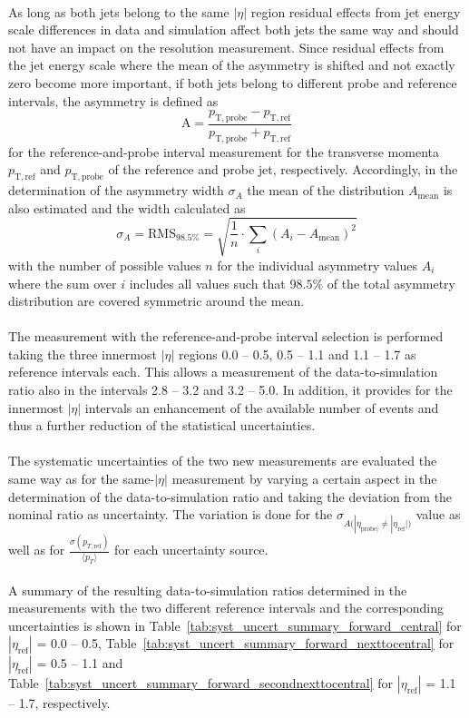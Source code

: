 \\
As long as both jets belong to the same $|\eta|$ region residual effects from jet energy scale differences in data and simulation affect both jets the same way and should not have an impact on the resolution measurement. Since residual effects from the jet energy scale where the mean of the asymmetry is shifted and not exactly zero become more important, if both jets belong to different probe and reference intervals, the asymmetry is defined as
\begin{equation}
\label{eq:forwardasymmdef}
  \mathrm{A} = \frac{p_{\mathrm{T,probe}} - p_{\mathrm{T,ref}}}{p_{\mathrm{T,probe}} + p_{\mathrm{T,ref}}} 
 \end{equation}
for the reference-and-probe interval measurement for the transverse momenta $p_{\mathrm{T,ref}}$ and $p_{\mathrm{T,probe}}$ of the reference and probe jet, respectively. Accordingly, in the determination of the asymmetry width $\sigma_{A}$ the mean of the distribution $A_\mathrm{mean}$ is also estimated and the width calculated as
\begin{equation}
\label{eq:forwardasymmwidthdef}
  \sigma_{A} = \mathrm{RMS}_{98.5\%} = \sqrt{\frac{1}{n} \cdot \sum_{i}(A_i-A_\mathrm{mean})^2} 
 \end{equation}
with the number of possible values $n$ for the individual asymmetry values $A_i$ where the sum over $i$ includes all values such that $98.5\%$ of the total asymmetry distribution are covered symmetric around the mean.\\
\\
The measurement with the reference-and-probe interval selection is performed taking the three innermost $|\eta|$ regions 0.0 -- 0.5, 0.5 -- 1.1 and 1.1 -- 1.7 as reference intervals each. This allows a measurement of the data-to-simulation ratio also in the intervals 2.8 -- 3.2 and 3.2 -- 5.0. In addition, it provides for the innermost $|\eta|$ intervals an enhancement of the available number of events and thus a further reduction of the statistical uncertainties.\\
\\
The systematic uncertainties of the two new measurements are evaluated the same way as for the same-$|\eta|$ measurement by varying a certain aspect in the determination of the data-to-simulation ratio and taking the deviation from the nominal ratio as uncertainty. The variation is done for the $\sigma_{A({|\eta_{\mathrm{probe}|} \neq |\eta_{\mathrm{ref}}|)}}$ value as well as for $\frac{\sigma (p_{T, \mathrm{ref}})}{{\langle p_{T} \rangle}}$ for each uncertainty source.\\
\\
A summary of the resulting data-to-simulation ratios determined in the measurements with the two different reference intervals and the corresponding uncertainties is shown in Table~\ref{tab:syst_uncert_summary_forward_central} for $|\eta_\mathrm{ref}|$ = 0.0 -- 0.5, Table~\ref{tab:syst_uncert_summary_forward_nexttocentral} for $|\eta_\mathrm{ref}|$ = 0.5 -- 1.1 and Table~\ref{tab:syst_uncert_summary_forward_secondnexttocentral} for $|\eta_\mathrm{ref}|$ = 1.1 -- 1.7, respectively.

